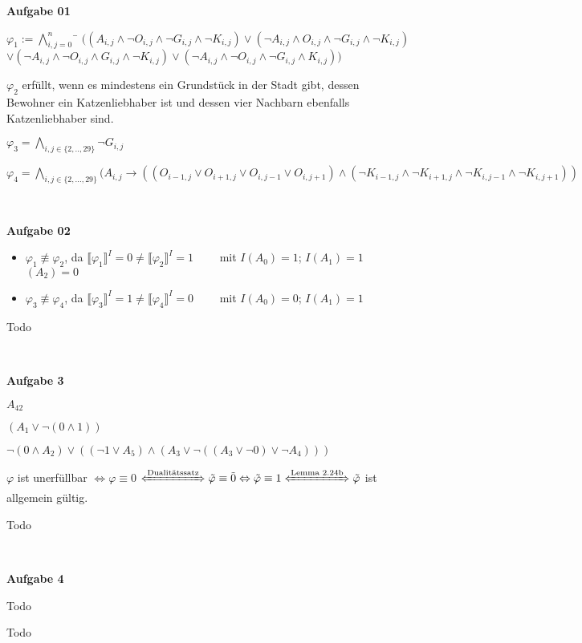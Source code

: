 \documentclass[a4paper,10pt]{article}
\begin{document}
	\parindent0pt
	\textbf{Aufgabe 01}
	\begin{compactenum} [(a)]
		\item  \begin{tabbing} $
			\varphi_1 := \bigwedge\limits_{i,j=0}^n $
			\= $ ((A_{i,j}\wedge \lnot O_{i,j} \wedge \lnot G_{i,j}\wedge \lnot K_{i,j})\vee(\lnot A_{i,j}\wedge O_{i,j}\wedge\lnot G_{i,j}\wedge \lnot K_{i,j}) $ \\
			\> $ \vee ( \lnot A_{i,j}\wedge \lnot O_{i,j}\wedge G_{i,j}\wedge \lnot K_{i,j})\vee( \lnot A_{i,j}\wedge \lnot O_{i,j}\wedge \lnot G_{i,j}\wedge K_{i,j}))$
		\end{tabbing} 
		
		 
		\item $ \varphi_2 $ erfüllt, wenn es mindestens ein Grundstück in der Stadt gibt, dessen Bewohner ein Katzenliebhaber ist und dessen vier Nachbarn ebenfalls Katzenliebhaber sind.
		\item $ \varphi_3 = \bigwedge\limits_{i,j \in \{2,..,29\}} \lnot G_{i,j} $
		\item $ \varphi_4 = \bigwedge\limits_{i,j \in \{2,...,29\}} (A_{i,j} \rightarrow ((O_{i-1,j} \vee O_{i+1,j} \vee O_{i,j-1} \vee O_{i,j+1}) \wedge (\lnot K_{i-1,j} \wedge \lnot K_{i+1,j} \wedge \lnot K_{i,j-1} \wedge \lnot K_{i,j+1})) $
	\end{compactenum} \
	
	\textbf{Aufgabe 02}
	\begin{compactenum} [(a)]
		\item
		\begin{itemize}
			\item $ \varphi_1 \not\equiv \varphi_2$, da $ \llbracket \varphi_1 \rrbracket ^I = 0 \neq \llbracket \varphi_2 \rrbracket ^I = 1 \qquad$ mit $ I(A_0) = 1 $; $ I(A_1) = 1 $ $ (A_2) = 0 $
			\item $ \varphi_3 \not\equiv \varphi_4$, da $ \llbracket \varphi_3 \rrbracket ^I = 1 \neq \llbracket \varphi_4 \rrbracket ^I = 0 \qquad$ mit $ I(A_0) = 0 $; $ I(A_1) = 1 $
		\end{itemize}
		\item Todo	
	\end{compactenum} \
	
	\textbf{Aufgabe 3}
	\begin{compactenum} [(a)]
		\item 
		\begin{compactenum} [(i)]
			\item $ A_{42} $
			\item $ (A_1 \vee \lnot (0 \wedge 1)) $
			\item $ \lnot (0 \wedge A_2) \vee ((\lnot 1 \vee A_5) \wedge (A_3 \vee \lnot ((A_3 \vee \lnot 0) \vee \lnot A_4))) $
		\end{compactenum}
		
		\item $ \varphi $ ist unerfüllbar $\Leftrightarrow \varphi \equiv 0$
		$ \xLeftrightarrow{\text{Dualitätssatz}} \tilde{\varphi} \equiv \tilde{0} \Leftrightarrow \tilde{\varphi} \equiv 1 \xLeftrightarrow{\text{Lemma 2.24b}} \tilde{\varphi} $ ist allgemein gültig.
		\item Todo
	\end{compactenum}\
	
	\textbf{Aufgabe 4}
	\begin{compactenum} [(a)]
		\item Todo
		
		\item Todo
	\end{compactenum}
\end{document}
